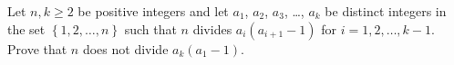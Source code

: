 Let $n, k \ge 2$ be positive integers and let $a_1$, $a_2$, $a_3$, \dots, $a_k$
be distinct integers in the set $\left\{ 1,2,\dots,n \right\}$
such that $n$ divides $a_i(a_{i+1} - 1)$ for $i = 1,2,\dots,k-1$.
Prove that $n$ does not divide $a_k(a_1 - 1)$.